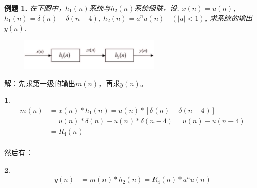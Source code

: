 \documentclass[notheorems,compress,mathserif,table]{beamer}
\newtheorem{example}{例题}
\newtheorem{dablock}{}
\begin{document}
\begin{frame}[shrink]\frametitle{}%
\begin{example}
在下图中，$h_{1}(n)$系统与$h_{2}(n)$系统级联，设,
$x(n)=u(n)$,
$h_{1}(n)=\delta(n)-\delta(n-4)$,
$h_{2}(n)=a^{n}u(n)\quad(|a|<1)$,
求系统的输出$y(n)$.
\end{example}
%
\begin{figure}[h]
\centering
\includegraphics[width=0.6\textwidth]{li135.jpg}\\
\end{figure}

解：先求第一级的输出$m(n)$，再求$y(n)$。
\begin{dablock}
\begin{equation*}
\begin{split}
    m(n)  &= x(n)*h_{1}(n)= u(n)*[\delta(n)-\delta(n-4)]\\
          &=u(n)*\delta(n) - u(n)*\delta(n-4)=u(n)-u(n-4) \\
          &= R_{4}(n)\\
\end{split}
\end{equation*}
\end{dablock}
然后有：
\begin{dablock}
\begin{equation*}
\begin{split}
    y(n) &= m(n)*h_{2}(n) = R_{4}(n)*a^{n}u(n)\\
\end{split}
\end{equation*}
\end{dablock}


\end{frame}
\end{document}

